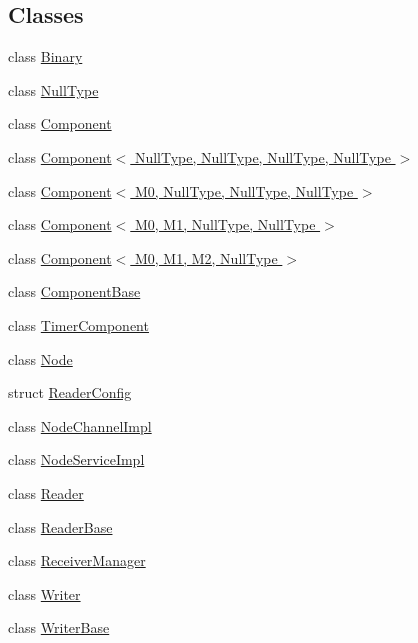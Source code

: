 \subsection*{Classes}
\begin{DoxyCompactItemize}
\item 
class \hyperlink{classapollo_1_1cyber_1_1Binary}{Binary}
\item 
class \hyperlink{classapollo_1_1cyber_1_1NullType}{Null\-Type}
\item 
class \hyperlink{classapollo_1_1cyber_1_1Component}{Component}
\item 
class \hyperlink{classapollo_1_1cyber_1_1Component_3_01NullType_00_01NullType_00_01NullType_00_01NullType_01_4}{Component$<$ Null\-Type, Null\-Type, Null\-Type, Null\-Type $>$}
\item 
class \hyperlink{classapollo_1_1cyber_1_1Component_3_01M0_00_01NullType_00_01NullType_00_01NullType_01_4}{Component$<$ M0, Null\-Type, Null\-Type, Null\-Type $>$}
\item 
class \hyperlink{classapollo_1_1cyber_1_1Component_3_01M0_00_01M1_00_01NullType_00_01NullType_01_4}{Component$<$ M0, M1, Null\-Type, Null\-Type $>$}
\item 
class \hyperlink{classapollo_1_1cyber_1_1Component_3_01M0_00_01M1_00_01M2_00_01NullType_01_4}{Component$<$ M0, M1, M2, Null\-Type $>$}
\item 
class \hyperlink{classapollo_1_1cyber_1_1ComponentBase}{Component\-Base}
\item 
class \hyperlink{classapollo_1_1cyber_1_1TimerComponent}{Timer\-Component}
\item 
class \hyperlink{classapollo_1_1cyber_1_1Node}{Node}
\item 
struct \hyperlink{structapollo_1_1cyber_1_1ReaderConfig}{Reader\-Config}
\item 
class \hyperlink{classapollo_1_1cyber_1_1NodeChannelImpl}{Node\-Channel\-Impl}
\item 
class \hyperlink{classapollo_1_1cyber_1_1NodeServiceImpl}{Node\-Service\-Impl}
\item 
class \hyperlink{classapollo_1_1cyber_1_1Reader}{Reader}
\item 
class \hyperlink{classapollo_1_1cyber_1_1ReaderBase}{Reader\-Base}
\item 
class \hyperlink{classapollo_1_1cyber_1_1ReceiverManager}{Receiver\-Manager}
\item 
class \hyperlink{classapollo_1_1cyber_1_1Writer}{Writer}
\item 
class \hyperlink{classapollo_1_1cyber_1_1WriterBase}{Writer\-Base}

\end{DoxyCompactItemize}
